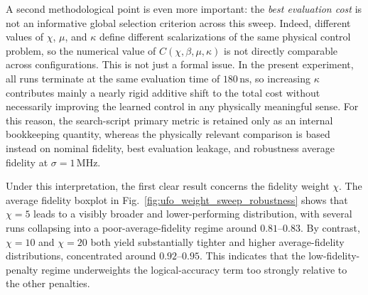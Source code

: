 A second methodological point is even more important: the \emph{best evaluation cost} is not an informative global selection criterion across this sweep. Indeed, different values of \(\chi\), \(\mu\), and \(\kappa\) define different scalarizations of the same physical control problem, so the numerical value of \(C(\chi,\beta,\mu,\kappa)\) is not directly comparable across configurations. This is not just a formal issue. In the present experiment, all runs terminate at the same evaluation time of \(180\,\mathrm{ns}\), so increasing \(\kappa\) contributes mainly a nearly rigid additive shift to the total cost without necessarily improving the learned control in any physically meaningful sense. For this reason, the search-script primary metric is retained only as an internal bookkeeping quantity, whereas the physically relevant comparison is based instead on nominal fidelity, best evaluation leakage, and robustness average fidelity at \(\sigma=1\,\mathrm{MHz}\).

Under this interpretation, the first clear result concerns the fidelity weight \(\chi\). The average fidelity boxplot in Fig.~\ref{fig:ufo_weight_sweep_robustness} shows that \(\chi=5\) leads to a visibly broader and lower-performing distribution, with several runs collapsing into a poor-average-fidelity regime around \(0.81\)--\(0.83\). By contrast, \(\chi=10\) and \(\chi=20\) both yield substantially tighter and higher average-fidelity distributions, concentrated around \(0.92\)--\(0.95\). This indicates that the low-fidelity-penalty regime underweights the logical-accuracy term too strongly relative to the other penalties. 

